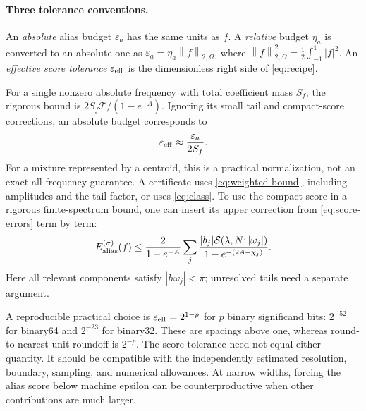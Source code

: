 \documentclass[11pt]{article}
\theoremstyle{definition}\newtheorem{definition}[theorem]{Definition}
\theoremstyle{remark}\newtheorem{remark}[theorem]{Remark}
\numberwithin{equation}{section}
\newcommand{\norm}[1]{\left\lVert#1\right\rVert}
\newcommand{\T}{\mathcal T}
\newcommand{\Sscore}{\mathcal S}
\begin{document}
\paragraph{Three tolerance conventions.}
An \emph{absolute} alias budget $\varepsilon_a$ has the same units as $f$. A \emph{relative} budget $\eta_a$ is converted to an absolute one as $\varepsilon_a=\eta_a\norm f_{2,\Omega}$, where
$\norm f_{2,\Omega}^2=\tfrac12\int_{-1}^1|f|^2$.
An \emph{effective score tolerance} $\varepsilon_{\rm eff}$ is the dimensionless right side of \eqref{eq:recipe}.

For a single nonzero absolute frequency with total coefficient mass $S_f$, the rigorous bound is $2S_f\T/(1-e^{-A})$. Ignoring its small tail and compact-score corrections, an absolute budget corresponds to
\begin{equation}
 \varepsilon_{\rm eff}\approx\frac{\varepsilon_a}{2S_f}.
 \label{eq:effective-tolerance}
\end{equation}
For a mixture represented by a centroid, this is a practical normalization, not an exact all-frequency guarantee. A certificate uses \eqref{eq:weighted-bound}, including amplitudes and the tail factor, or uses \eqref{eq:class}. To use the compact score in a rigorous finite-spectrum bound, one can insert its upper correction from \eqref{eq:score-errors} term by term:
\begin{equation}
 E_{\rm alias}^{(\sigma)}(f)
 \le\frac2{1-e^{-A}}\sum_j
 \frac{|b_j|\Sscore(\lambda,N;|\omega_j|)}{1-e^{-(2A-\chi_j)}}.
 \label{eq:compact-certificate}
\end{equation}
Here all relevant components satisfy $|h\omega_j|<\pi$; unresolved tails need a separate argument.

A reproducible practical choice is $\varepsilon_{\rm eff}=2^{1-p}$ for $p$ binary significand bits: $2^{-52}$ for binary64 and $2^{-23}$ for binary32. These are spacings above one, whereas round-to-nearest unit roundoff is $2^{-p}$. The score tolerance need not equal either quantity. It should be compatible with the independently estimated resolution, boundary, sampling, and numerical allowances. At narrow widths, forcing the alias score below machine epsilon can be counterproductive when other contributions are much larger.
\end{document}
